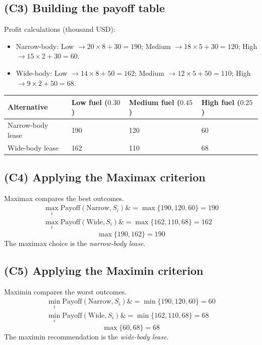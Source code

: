 \documentclass[11pt]{article}
\begin{document}
	\subsection*{(C3) Building the payoff table}
	
	\hypertarget{problem10-c3}{}
	
	Profit calculations (thousand USD):
	\begin{itemize}
		\item Narrow-body: Low $\to 20 \times 8 + 30 = 190$; Medium $\to 18 \times 5 + 30 = 120$; High $\to 15 \times 2 + 30 = 60$.
		\item Wide-body: Low $\to 14 \times 8 + 50 = 162$; Medium $\to 12 \times 5 + 50 = 110$; High $\to 9 \times 2 + 50 = 68$.
	\end{itemize}
	\begin{center}
		\begin{tabular}{llll}
			\toprule
			Alternative & Low fuel
			($0.30$) & Medium fuel
			($0.45$) & High fuel
			($0.25$) \\
			\midrule
			Narrow-body lease & 190 & 120 & 60 \\
			Wide-body lease & 162 & 110 & 68 \\
			\bottomrule
		\end{tabular}
	\end{center}
	
	\subsection*{(C4) Applying the Maximax criterion}
	
	\hypertarget{problem10-c4}{}
	
	Maximax compares the best outcomes.
	\[
	\begin{aligned}
		\max_i \text{Payoff}(\text{Narrow}, S_i) \&= \max\{190, 120, 60\} = 190 \\
		\max_i \text{Payoff}(\text{Wide}, S_i) \&= \max\{162, 110, 68\} = 162
	\end{aligned}
	\]
	\[
	\max\{190, 162\} = 190
	\]
	The maximax choice is the \emph{narrow-body lease}.
	
	\subsection*{(C5) Applying the Maximin criterion}
	
	\hypertarget{problem10-c5}{}
	
	Maximin compares the worst outcomes.
	\[
	\begin{aligned}
		\min_i \text{Payoff}(\text{Narrow}, S_i) \&= \min\{190, 120, 60\} = 60 \\
		\min_i \text{Payoff}(\text{Wide}, S_i) \&= \min\{162, 110, 68\} = 68
	\end{aligned}
	\]
	\[
	\max\{60, 68\} = 68
	\]
	The maximin recommendation is the \emph{wide-body lease}.
	
\end{document}
